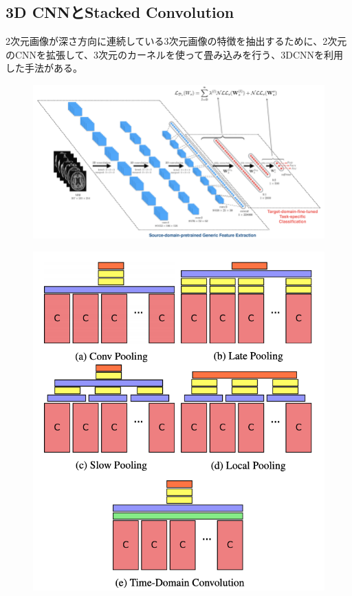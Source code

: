 \documentclass[a4j,10pt,oneside,openany]{jsbook}
\begin{document}
\subsection{3D CNNとStacked Convolution}
2次元画像が深さ方向に連続している3次元画像の特徴を抽出するために、2次元のCNNを拡張して、3次元のカーネルを使って畳み込みを行う、3DCNNを利用した手法がある。

\begin{figure}[h]
\centering
\includegraphics[width=0.7\linewidth]{img/3d_cnn.png}
\end{figure}


\begin{figure}[h]
\centering
\includegraphics[width=0.7\linewidth]{img/stacked_conv.png}
\end{figure}
\end{document}

